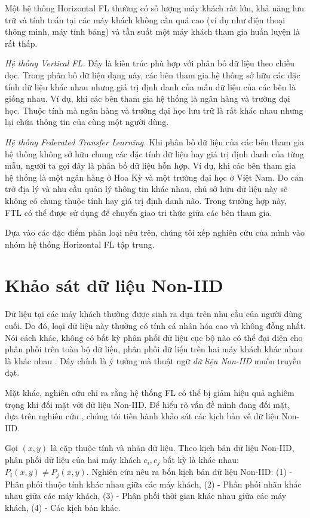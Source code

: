 Một hệ thống Horizontal FL thường có số lượng máy khách rất lớn, khả năng lưu trữ và tính toán tại các máy khách không cần quá cao (ví dụ như điện thoại thông minh, máy tính bảng) và tần suất một máy khách tham gia huấn luyện là rất thấp.

\textit{Hệ thống Vertical FL.} Đây là kiến trúc phù hợp với phân bố dữ liệu theo chiều dọc. Trong phân bố dữ liệu dạng này, các bên tham gia hệ thống sở hữu các đặc tính dữ liệu khác nhau nhưng giá trị định danh của mẫu dữ liệu của các bên là giống nhau. Ví dụ, khi các bên tham gia hệ thống là ngân hàng và trường đại học. Thuộc tính mà ngân hàng và trường đại học lưu trữ là rất khác nhau nhưng lại chứa thông tin của cùng một người dùng.

\textit{Hệ thống Federated Transfer Learning.} Khi phân bố dữ liệu của các bên tham gia hệ thống không sở hữu chung các đặc tính dữ liệu hay giá trị định danh của từng mẫu, người ta gọi đây là phân bố dữ liệu hỗn hợp. Ví dụ, khi các bên tham gia hệ thống là một ngân hàng ở Hoa Kỳ và một trường đại học ở Việt Nam. Do cản trở địa lý và nhu cầu quản lý thông tin khác nhau, chủ sở hữu dữ liệu này sẽ không có chung thuộc tính hay giá trị định danh nào. Trong trường hợp này, FTL có thể được sử dụng để chuyển giao tri thức giữa các bên tham gia.

Dựa vào các đặc điểm phân loại nêu trên, chúng tôi xếp nghiên cứu của mình vào nhóm hệ thống Horizontal FL tập trung.

\section{Khảo sát dữ liệu Non-IID}

Dữ liệu tại các máy khách thường được sinh ra dựa trên nhu cầu của người dùng cuối. Do đó, loại dữ liệu này thường có tính cá nhân hóa cao và không đồng nhất. Nói cách khác, không có bất kỳ phân phối dữ liệu cục bộ nào có thể đại diện cho phân phối trên toàn bộ dữ liệu, phân phối dữ liệu trên hai máy khách khác nhau là khác nhau \cite{zhu2021federated}. Đây chính là ý tưởng mà thuật ngữ \textit{dữ liệu Non-IID} muốn truyền đạt.

Mặt khác, nghiên cứu \cite{zhao2018federated} chỉ ra rằng hệ thống FL có thể bị giảm hiệu quả nghiêm trọng khi đối mặt với dữ liệu Non-IID. Để hiểu rõ vấn đề mình đang đối mặt, dựa trên nghiên cứu \cite{zhu2021federated}, chúng tôi tiến hành khảo sát các kịch bản về dữ liệu Non-IID.

Gọi $(x, y)$ là cặp thuộc tính và nhãn dữ liệu. Theo kịch bản dữ liệu Non-IID, phân phối dữ liệu của hai máy khách $c_i, c_j$ bất kỳ là khác nhau: $P_i(x, y) \ne P_j(x, y)$. Nghiên cứu \cite{zhu2021federated} nêu ra bốn kịch bản dữ liệu Non-IID: (1) - Phân phối thuộc tính khác nhau giữa các máy khách, (2) - Phân phối nhãn khác nhau giữa các máy khách, (3) - Phân phối thời gian khác nhau giữa các máy khách, (4) - Các kịch bản khác.


